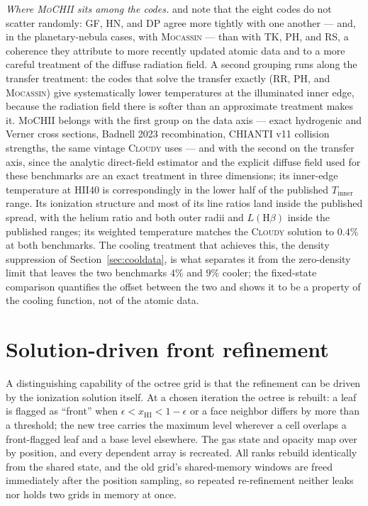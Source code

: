 \documentclass[twocolumn,linenumbers]{aastex702}
\newcommand{\MoCHII}{\textsc{MoCHII}}
\newcommand{\xHI}{x_{\mathrm{HI}}}
\begin{document}
\emph{Where \MoCHII{} sits among the codes.}  \citet{pequignot2001} and
\citet{ercolano2003} note that the eight codes do not scatter randomly:
GF, HN, and DP agree more tightly with one another --- and, in the
planetary-nebula cases, with \textsc{Mocassin} --- than with TK, PH, and RS,
a coherence they attribute to more recently updated atomic data and to a
more careful treatment of the diffuse radiation field.  A second grouping
runs along the transfer treatment: the codes that solve the transfer exactly
(RR, PH, and \textsc{Mocassin}) give systematically lower temperatures at
the illuminated inner edge, because the radiation field there is softer than
an approximate treatment makes it.  \MoCHII{} belongs with the first group on
the data axis --- exact hydrogenic and Verner cross sections, Badnell 2023
recombination, CHIANTI v11 collision strengths, the same vintage
\textsc{Cloudy} uses --- and with the second on the transfer axis, since the
analytic direct-field estimator and the explicit diffuse field used for
these benchmarks are an exact treatment in three dimensions; its inner-edge
temperature at HII40 is correspondingly in the lower half of the published
$T_{\mathrm{inner}}$ range.  Its ionization structure and most of its line
ratios land inside the published spread, with the helium ratio and both
outer radii and $L(\mathrm{H}\beta)$ inside the published ranges; its
weighted temperature matches the \textsc{Cloudy} solution to $0.4\%$ at
both benchmarks.  The cooling treatment that
achieves this, the density suppression of Section~\ref{sec:cooldata}, is
what separates it from the zero-density limit that leaves the two benchmarks
$4\%$ and $9\%$ cooler; the fixed-state comparison quantifies the offset between
the two and shows it to be a property of the cooling function, not of the
atomic data.

\section{Solution-driven front refinement}
\label{sec:refine}

A distinguishing capability of the octree grid is that the refinement can
be driven by the ionization solution itself.  At a chosen iteration the
octree is rebuilt: a leaf is flagged as ``front'' when
$\epsilon < \xHI < 1-\epsilon$ or a face neighbor differs by more than a
threshold; the new tree carries the maximum level wherever a cell overlaps
a front-flagged leaf and a base level elsewhere.  The gas state and opacity
map over by position, and every dependent array is recreated.  All ranks
rebuild identically from the shared state, and the old grid's
shared-memory windows are freed immediately after the position sampling, so
repeated re-refinement neither leaks nor holds two grids in memory at
once.
\end{document}

